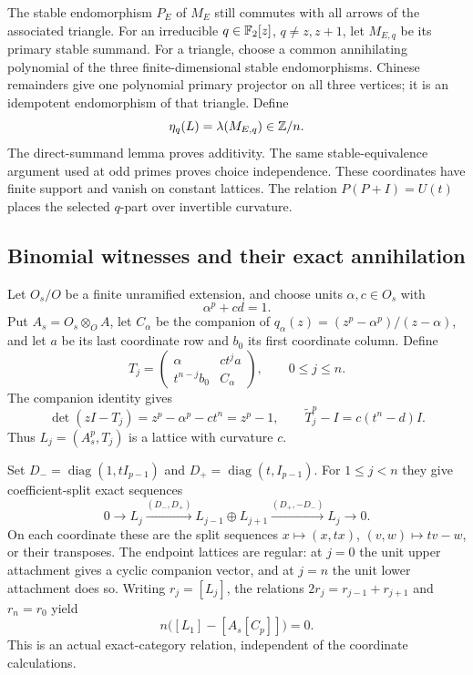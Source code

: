The stable endomorphism $P_E$ of $M_E$ still commutes with
all arrows of the associated triangle.
For an irreducible $q\in\mathbb F_2[z]$, $q\ne z,z+1$, let
$M_{E,q}$ be its primary stable summand.
For a triangle, choose a common annihilating polynomial
of the three finite-dimensional stable endomorphisms.
Chinese remainders give one polynomial primary projector
on all three vertices; it is an idempotent endomorphism
of that triangle.  Define
\begin{equation}\label{eq:binomial-all-two-coordinate}
 \eta_q(L)=\lambda(M_{E,q})\in\mathbb Z/n.
\end{equation}
The direct-summand lemma proves additivity.
The same stable-equivalence argument used at odd primes
proves choice independence.  These coordinates have finite
support and vanish on constant lattices.
The relation $P(P+I)=U(t)$ places the selected $q$-part
over invertible curvature.

\subsection{Binomial witnesses and their exact annihilation}

Let $O_s/O$ be a finite unramified extension, and choose
units $\alpha,c\in O_s$ with
\begin{equation}\label{eq:binomial-all-parameter}
 \alpha^p+cd=1.
\end{equation}
Put $A_s=O_s\otimes_O A$, let $C_\alpha$ be the companion
of $q_\alpha(z)=(z^p-\alpha^p)/(z-\alpha)$,
and let $a$ be its last coordinate row and $b_0$ its first
coordinate column.  Define
\[
 T_j=
 \begin{pmatrix}
 \alpha&ct^j a\\ t^{n-j}b_0&C_\alpha
 \end{pmatrix},
 \qquad 0\le j\le n.
\]
The companion identity gives
\[
 \det(zI-T_j)=z^p-\alpha^p-ct^n=z^p-1,\qquad
 \widetilde T_j^p-I=c(t^n-d)I.
\]
Thus $L_j=(A_s^p,T_j)$ is a lattice with curvature $c$.

Set $D_-=\operatorname{diag}(1,tI_{p-1})$ and
$D_+=\operatorname{diag}(t,I_{p-1})$.
For $1\le j<n$ they give coefficient-split exact sequences
\[
 0\longrightarrow L_j
 \xrightarrow{(D_-,D_+)}L_{j-1}\oplus L_{j+1}
 \xrightarrow{(D_+,-D_-)}L_j\longrightarrow0.
\]
On each coordinate these are the split sequences
$x\mapsto(x,tx)$, $(v,w)\mapsto tv-w$, or their transposes.
The endpoint lattices are regular: at $j=0$ the unit upper
attachment gives a cyclic companion vector, and at $j=n$
the unit lower attachment does so.
Writing $r_j=[L_j]$, the relations
$2r_j=r_{j-1}+r_{j+1}$ and $r_n=r_0$ yield
\begin{equation}\label{eq:binomial-all-annihilator}
 n\bigl([L_1]-[A_s[C_p]]\bigr)=0.
\end{equation}
This is an actual exact-category relation, independent
of the coordinate calculations.


